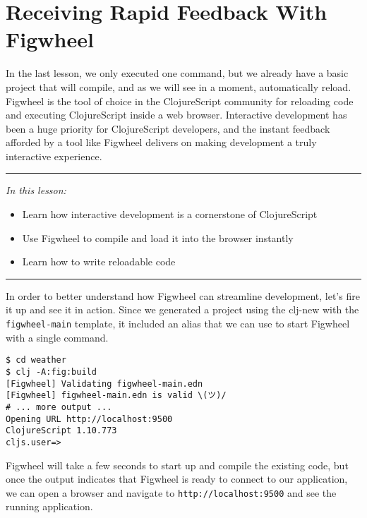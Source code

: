 \documentclass[10pt,twoside,openright]{memoir}
\begin{document}
\chapter{Receiving Rapid Feedback With Figwheel}

In the last lesson, we only executed one command, but we already have a
basic project that will compile, and as we will see in a moment,
automatically reload. Figwheel is the tool of choice in the
ClojureScript community for reloading code and executing ClojureScript
inside a web browser. Interactive development has been a huge priority
for ClojureScript developers, and the instant feedback afforded by a
tool like Figwheel delivers on making development a truly interactive
experience.

\begin{center}\rule{0.5\linewidth}{0.5pt}\end{center}

\emph{In this lesson:}

\begin{itemize}
\tightlist
\item
  Learn how interactive development is a cornerstone of ClojureScript
\item
  Use Figwheel to compile and load it into the browser instantly
\item
  Learn how to write reloadable code
\end{itemize}

\begin{center}\rule{0.5\linewidth}{0.5pt}\end{center}

In order to better understand how Figwheel can streamline development,
let's fire it up and see it in action. Since we generated a project
using the clj-new with the \texttt{figwheel-main} template, it included
an alias that we can use to start Figwheel with a single command.

\begin{verbatim}
$ cd weather
$ clj -A:fig:build
[Figwheel] Validating figwheel-main.edn
[Figwheel] figwheel-main.edn is valid \(ツ)/
# ... more output ...
Opening URL http://localhost:9500
ClojureScript 1.10.773
cljs.user=>
\end{verbatim}

Figwheel will take a few seconds to start up and compile the existing
code, but once the output indicates that Figwheel is ready to connect to
our application, we can open a browser and navigate to
\texttt{http://localhost:9500} and see the running application.
\end{document}
